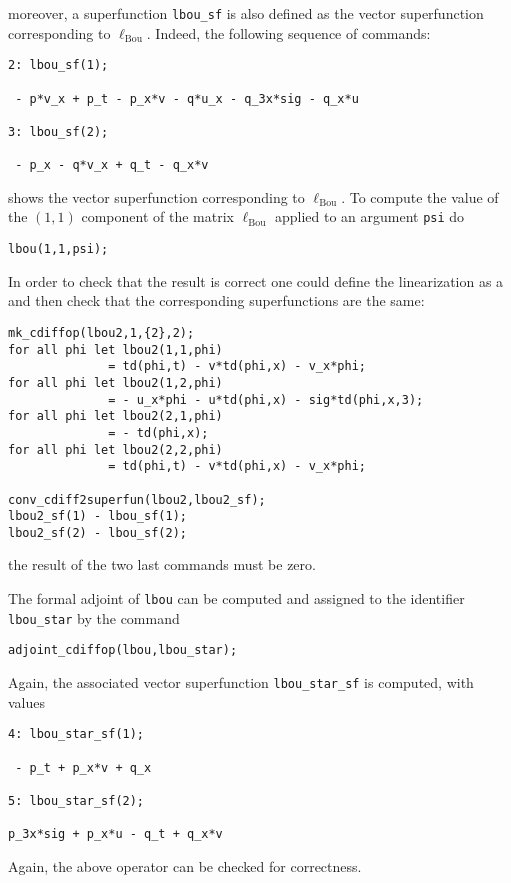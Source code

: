 moreover, a superfunction \texttt{lbou\_sf} is also defined as the vector
superfunction corresponding to $\ell_{\text{Bou}}$.
Indeed, the following sequence of commands:
\begin{verbatim}
2: lbou_sf(1);

 - p*v_x + p_t - p_x*v - q*u_x - q_3x*sig - q_x*u

3: lbou_sf(2);

 - p_x - q*v_x + q_t - q_x*v
\end{verbatim}
shows the vector superfunction corresponding to $\ell_{\text{Bou}}$. To compute
the value of the $(1,1)$ component of the matrix $\ell_{\text{Bou}}$ applied to
an argument \texttt{psi} do
\begin{verbatim}
lbou(1,1,psi);
\end{verbatim}
In order to check that the result is correct one could define the linearization
as a \cdiffop and then check that the corresponding superfunctions are the
same:
\begin{verbatim}
mk_cdiffop(lbou2,1,{2},2);
for all phi let lbou2(1,1,phi)
              = td(phi,t) - v*td(phi,x) - v_x*phi;
for all phi let lbou2(1,2,phi)
              = - u_x*phi - u*td(phi,x) - sig*td(phi,x,3);
for all phi let lbou2(2,1,phi)
              = - td(phi,x);
for all phi let lbou2(2,2,phi)
              = td(phi,t) - v*td(phi,x) - v_x*phi;

conv_cdiff2superfun(lbou2,lbou2_sf);
lbou2_sf(1) - lbou_sf(1);
lbou2_sf(2) - lbou_sf(2);
\end{verbatim}
the result of the two last commands must be zero.

The formal adjoint of \texttt{lbou} can be computed and assigned to the
identifier \texttt{lbou\_star} by the command
\begin{verbatim}
adjoint_cdiffop(lbou,lbou_star);
\end{verbatim}
Again, the associated vector superfunction \texttt{lbou\_star\_sf} is computed,
with values
\begin{verbatim}
4: lbou_star_sf(1);

 - p_t + p_x*v + q_x

5: lbou_star_sf(2);

p_3x*sig + p_x*u - q_t + q_x*v
\end{verbatim}
Again, the above operator can be checked for correctness.

